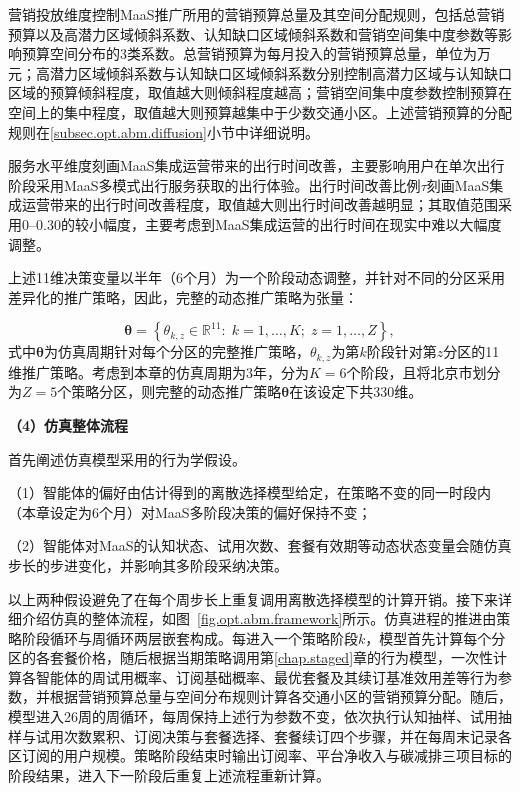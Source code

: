 营销投放维度控制MaaS推广所用的营销预算总量及其空间分配规则，包括总营销预算以及高潜力区域倾斜系数、认知缺口区域倾斜系数和营销空间集中度参数等影响预算空间分布的3类系数。总营销预算为每月投入的营销预算总量，单位为万元；高潜力区域倾斜系数与认知缺口区域倾斜系数分别控制高潜力区域与认知缺口区域的预算倾斜程度，取值越大则倾斜程度越高；营销空间集中度参数控制预算在空间上的集中程度，取值越大则预算越集中于少数交通小区。上述营销预算的分配规则在\ref{subsec.opt.abm.diffusion}小节中详细说明。

服务水平维度刻画MaaS集成运营带来的出行时间改善，主要影响用户在单次出行阶段采用MaaS多模式出行服务获取的出行体验。出行时间改善比例$\tau$刻画MaaS集成运营带来的出行时间改善程度，取值越大则出行时间改善越明显；其取值范围采用0--0.30的较小幅度，主要考虑到MaaS集成运营的出行时间在现实中难以大幅度调整。

上述11维决策变量以半年（6个月）为一个阶段动态调整，并针对不同的分区采用差异化的推广策略，因此，完整的动态推广策略为张量：

\begin{equation}
\bm{\theta}=\left\{\theta_{k,z}\in\mathbb{R}^{11}:\;k=1,\dots,K;\;z=1,\dots,Z\right\},
\label{eq.opt.thetadef}
\end{equation}
式中$\bm{\theta}$为仿真周期针对每个分区的完整推广策略，$\theta_{k,z}$为第$k$阶段针对第$z$分区的11维推广策略。考虑到本章的仿真周期为3年，分为$K=6$个阶段，且将北京市划分为$Z=5$个策略分区，则完整的动态推广策略$\bm{\theta}$在该设定下共330维。

\textbf{（4）仿真整体流程}

首先阐述仿真模型采用的行为学假设。

（1）智能体的偏好由估计得到的离散选择模型给定，在策略不变的同一时段内（本章设定为6个月）对MaaS多阶段决策的偏好保持不变；

（2）智能体对MaaS的认知状态、试用次数、套餐有效期等动态状态变量会随仿真步长的步进变化，并影响其多阶段采纳决策。

以上两种假设避免了在每个周步长上重复调用离散选择模型的计算开销。接下来详细介绍仿真的整体流程，如图~\ref{fig.opt.abm.framework}所示。仿真进程的推进由策略阶段循环与周循环两层嵌套构成。每进入一个策略阶段$k$，模型首先计算每个分区的各套餐价格，随后根据当期策略调用第\ref{chap.staged}章的行为模型，一次性计算各智能体的周试用概率、订阅基础概率、最优套餐及其续订基准效用差等行为参数，并根据营销预算总量与空间分布规则计算各交通小区的营销预算分配。随后，模型进入26周的周循环，每周保持上述行为参数不变，依次执行认知抽样、试用抽样与试用次数累积、订阅决策与套餐选择、套餐续订四个步骤，并在每周末记录各区订阅的用户规模。策略阶段结束时输出订阅率、平台净收入与碳减排三项目标的阶段结果，进入下一阶段后重复上述流程重新计算。


